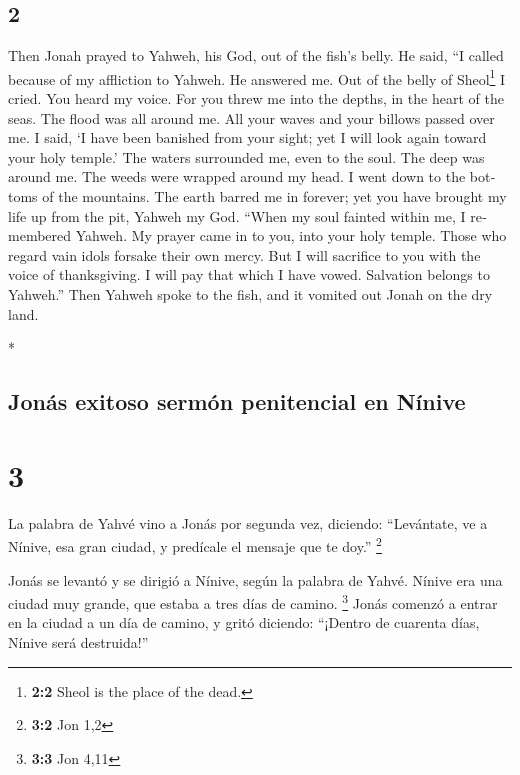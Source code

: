 \begin{paracol}{2}
\begin{otherlanguage}{english}
\hypertarget{section-3}{%
\section{2}\label{section-3}}

 Then Jonah prayed to Yahweh, his God, out of the fish's
belly.  He said, ``I called because of my affliction to
Yahweh. He answered me. Out of the belly of Sheol\footnote{\textbf{2:2}
  Sheol is the place of the dead.} I cried. You heard my voice.
 For you threw me into the depths, in the heart of the
seas. The flood was all around me. All your waves and your billows
passed over me.  I said, `I have been banished from your
sight; yet I will look again toward your holy temple.' 
The waters surrounded me, even to the soul. The deep was around me. The
weeds were wrapped around my head.  I went down to the
bottoms of the mountains. The earth barred me in forever; yet you have
brought my life up from the pit, Yahweh my God.  ``When my
soul fainted within me, I remembered Yahweh. My prayer came in to you,
into your holy temple.  Those who regard vain idols
forsake their own mercy.  But I will sacrifice to you with
the voice of thanksgiving. I will pay that which I have vowed. Salvation
belongs to Yahweh.''  Then Yahweh spoke to the fish, and
it vomited out Jonah on the dry land.

\end{otherlanguage}

\switchcolumn[0]*

\hypertarget{jonuxe1s-exitoso-sermuxf3n-penitencial-en-nuxednive}{%
\subsection{Jonás exitoso sermón penitencial en
Nínive}\label{jonuxe1s-exitoso-sermuxf3n-penitencial-en-nuxednive}}

\hypertarget{section-4}{%
\section{3}\label{section-4}}

 La palabra de Yahvé vino a Jonás por segunda vez,
diciendo:  ``Levántate, ve a Nínive, esa gran ciudad, y
predícale el mensaje que te doy.'' \footnote{\textbf{3:2} Jon 1,2}

 Jonás se levantó y se dirigió a Nínive, según la palabra
de Yahvé. Nínive era una ciudad muy grande, que estaba a tres días de
camino. \footnote{\textbf{3:3} Jon 4,11}  Jonás comenzó a
entrar en la ciudad a un día de camino, y gritó diciendo: ``¡Dentro de
cuarenta días, Nínive será destruida!''


\end{paracol}
